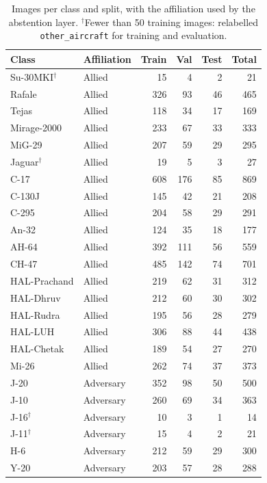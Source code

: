\begin{table}[t]
\centering
\caption{Images per class and split, with the affiliation used by the abstention layer. $^\dagger$Fewer than 50 training images: relabelled \texttt{other\_aircraft} for training and evaluation.}
\label{tab:classes}
\footnotesize
\setlength{\tabcolsep}{4pt}
\begin{tabular}{@{}llrrrr@{}}
\toprule
Class & Affiliation & Train & Val & Test & Total \\
\midrule
Su-30MKI$^\dagger$ & Allied & 15 & 4 & 2 & 21 \\
Rafale & Allied & 326 & 93 & 46 & 465 \\
Tejas & Allied & 118 & 34 & 17 & 169 \\
Mirage-2000 & Allied & 233 & 67 & 33 & 333 \\
MiG-29 & Allied & 207 & 59 & 29 & 295 \\
Jaguar$^\dagger$ & Allied & 19 & 5 & 3 & 27 \\
C-17 & Allied & 608 & 176 & 85 & 869 \\
C-130J & Allied & 145 & 42 & 21 & 208 \\
C-295 & Allied & 204 & 58 & 29 & 291 \\
An-32 & Allied & 124 & 35 & 18 & 177 \\
AH-64 & Allied & 392 & 111 & 56 & 559 \\
CH-47 & Allied & 485 & 142 & 74 & 701 \\
HAL-Prachand & Allied & 219 & 62 & 31 & 312 \\
HAL-Dhruv & Allied & 212 & 60 & 30 & 302 \\
HAL-Rudra & Allied & 195 & 56 & 28 & 279 \\
HAL-LUH & Allied & 306 & 88 & 44 & 438 \\
HAL-Chetak & Allied & 189 & 54 & 27 & 270 \\
Mi-26 & Allied & 262 & 74 & 37 & 373 \\
\addlinespace
J-20 & Adversary & 352 & 98 & 50 & 500 \\
J-10 & Adversary & 260 & 69 & 34 & 363 \\
J-16$^\dagger$ & Adversary & 10 & 3 & 1 & 14 \\
J-11$^\dagger$ & Adversary & 15 & 4 & 2 & 21 \\
H-6 & Adversary & 212 & 59 & 29 & 300 \\
Y-20 & Adversary & 203 & 57 & 28 & 288 \\

\end{tabular}
\end{table}
